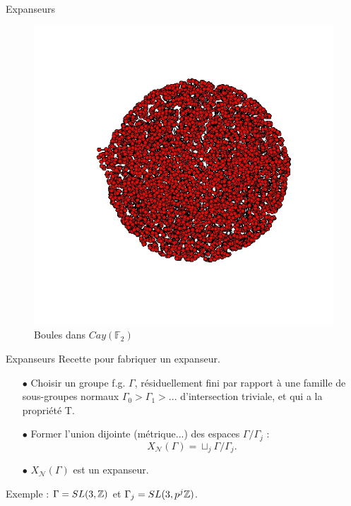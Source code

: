 \begin{frame}{Expanseurs}
\begin{figure}[h]\centering
\includegraphics[scale=0.35]{CayleyFree5.jpeg}
\caption{Boules dans $Cay(\mathbb F_2)$}
\label{fig:Cayley}
\end{figure}
\end{frame}

\begin{frame}{Expanseurs}
Recette pour fabriquer un expanseur.
\begin{itemize}
\item[$\bullet$] Choisir un groupe f.g. $\Gamma$, résiduellement fini par rapport à une famille de sous-groupes normaux $\Gamma_0 > \Gamma_1>...$ d'intersection triviale, et qui a la propriété T.
\item[$\bullet$] Former l'union dijointe (métrique...) des espaces $\Gamma/\Gamma_j$ :\[X_{\mathcal N}(\Gamma)=\sqcup_j \Gamma/\Gamma_j.\]
\item[$\bullet$] $X_{\mathcal N}(\Gamma)$ est un expanseur.
\end{itemize}

Exemple : $\Gamma = SL(3,\mathbb Z)$ et $ \Gamma_j = SL(3,p^j\mathbb Z)$.
\end{frame}

